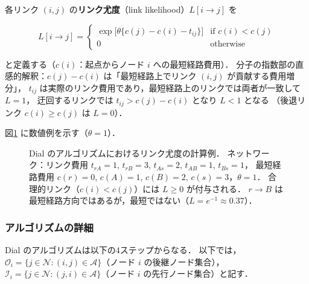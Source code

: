 各リンク $(i,j)$ の\textbf{リンク尤度}（link likelihood）$L[i \to j]$ を

\begin{equation}
  L[i \to j] =
  \begin{cases}
    \exp\!\bigl[\theta\{c(j) - c(i) - t_{ij}\}\bigr] & \text{if } c(i) < c(j) \\[4pt]
    0 & \text{otherwise}
  \end{cases}
  \label{eq:link-likelihood}
\end{equation}

と定義する（$c(i)$：起点からノード $i$ への最短経路費用）．
分子の指数部の直感的解釈：$c(j) - c(i)$ は「最短経路上でリンク $(i,j)$ が貢献する費用増分」，
$t_{ij}$ は実際のリンク費用であり，最短経路上のリンクでは両者が一致して $L=1$，
迂回するリンクでは $t_{ij} > c(j) - c(i)$ となり $L<1$ となる
（後退リンク $c(i) \geq c(j)$ は $L=0$）\cite{Dial1971}．

図\ref{fig:dial-example} に数値例を示す（$\theta = 1$）．

\begin{figure}[hbtp]
  \centering
  
  \caption{Dial のアルゴリズムにおけるリンク尤度の計算例．
           ネットワーク：リンク費用 $t_{rA}=1$, $t_{rB}=3$, $t_{As}=2$, $t_{AB}=1$, $t_{Bs}=1$，
           最短経路費用 $c(r)=0$, $c(A)=1$, $c(B)=2$, $c(s)=3$，$\theta=1$．
           合理的リンク（$c(i)<c(j)$）には $L \geq 0$ が付与される．
           $r \to B$ は最短経路方向ではあるが，最短ではない（$L = e^{-1} \approx 0.37$）．}
  \label{fig:dial-example}
\end{figure}

\subsubsection*{アルゴリズムの詳細}

Dial のアルゴリズムは以下の4ステップからなる\cite{Dial1971}．
以下では，$\mathcal{O}_i = \{j \in \mathcal{N} : (i,j) \in \mathcal{A}\}$（ノード $i$ の後継ノード集合），
$\mathcal{I}_i = \{j \in \mathcal{N} : (j,i) \in \mathcal{A}\}$（ノード $i$ の先行ノード集合）と記す．

